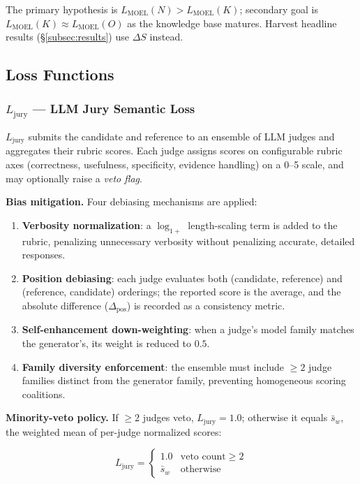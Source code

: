 The primary hypothesis is $L_\text{MOEL}(N) > L_\text{MOEL}(K)$; secondary
goal is $L_\text{MOEL}(K) \approx L_\text{MOEL}(O)$ as the knowledge base
matures.  Harvest headline results (\S\ref{subsec:results}) use $\Delta S$ instead.

\subsection{Loss Functions}

\subsubsection*{$L_\text{jury}$ --- LLM Jury Semantic Loss}

$L_\text{jury}$ submits the candidate and reference to an ensemble of LLM
judges and aggregates their rubric scores.  Each judge assigns scores on
configurable rubric axes (correctness, usefulness, specificity, evidence
handling) on a 0--5 scale, and may optionally raise a \emph{veto flag}.

\medskip
\noindent\textbf{Bias mitigation.}  Four debiasing mechanisms are applied:
\begin{enumerate}
  \item \textbf{Verbosity normalization}: a $\log_{1+}$ length-scaling term is
    added to the rubric, penalizing unnecessary verbosity without penalizing
    accurate, detailed responses.
  \item \textbf{Position debiasing}: each judge evaluates both
    (candidate, reference) and (reference, candidate) orderings; the reported
    score is the average, and the absolute difference ($\Delta_\text{pos}$) is
    recorded as a consistency metric.
  \item \textbf{Self-enhancement down-weighting}: when a judge's model family
    matches the generator's, its weight is reduced to $0.5$.
  \item \textbf{Family diversity enforcement}: the ensemble must include
    $\geq 2$ judge families distinct from the generator family, preventing
    homogeneous scoring coalitions.
\end{enumerate}

\noindent\textbf{Minority-veto policy.}  If $\geq 2$ judges veto,
$L_\text{jury} = 1.0$; otherwise it equals $\bar{s}_w$, the weighted mean of
per-judge normalized scores:

\begin{equation}
L_\text{jury} = \begin{cases} 1.0 & \text{veto count} \geq 2 \\ \bar{s}_w & \text{otherwise} \end{cases}
\label{eq:ljury}
\end{equation}

